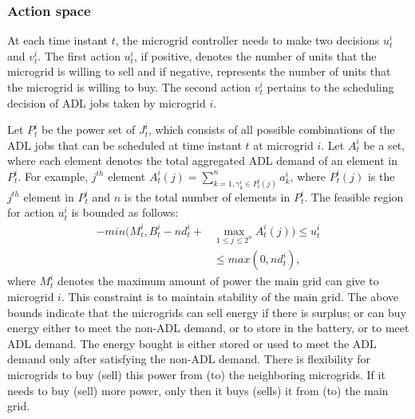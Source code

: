 \subsubsection{Action space}
At each time instant $t$, the microgrid controller needs to make two decisions $u_{t}^{i}$ and $v_{t}^{i}$. The first action $u_{t}^{i}$, if positive, denotes the number of units that the microgrid is willing to sell and if negative, represents the number of units that the microgrid is willing to buy. The second action $v_{t}^{i}$ pertains to the scheduling decision of ADL jobs taken by microgrid $i$.

Let $P_{t}^{i}$ be the power set of $J_{t}^{i}$, which consists of all possible combinations of the ADL jobs that can be scheduled at time instant $t$ at microgrid $i$. Let  $A_{t}^{i}$ be a set, where each element denotes the total aggregated ADL demand of an element in $P_{t}^{i}$. For example, $j^{th}$ element $A_{t}^{i}(j) = \sum_{k=1, \gamma_k^i \in P_{t}^{i}(j) }^n a_k^i$, where $ P_{t}^{i}(j)$ is the $j^{th}$ element in  $P_{t}^{i}$ and $n$ is the total number of elements in $P_{t}^{i}$.
 The feasible region for action $u_{t}^{i}$ is bounded as follows:
\begin{align}
-min(M_t^i, B_t^i - nd_t^i + &\max_{1\leq j \leq 2^n} A_t^i(j) ) \leq u_t^i \nonumber\\ &\leq max(0, nd_t^i),
\end{align}
where $M_t^i$ denotes the maximum amount of power the main grid can give to microgrid $i$. This constraint is to maintain stability of the main grid. The above bounds indicate that the  microgrids can sell energy if there is surplus; or can buy energy either to meet the non-ADL demand, or to store in the battery, or to meet ADL demand. The energy bought is either stored or used to meet the ADL demand only after satisfying the non-ADL demand. There is flexibility for microgrids to buy (sell) this power from (to) the neighboring microgrids. If it needs to buy (sell) more power, only then it buys (sells) it from (to) the main grid.  

